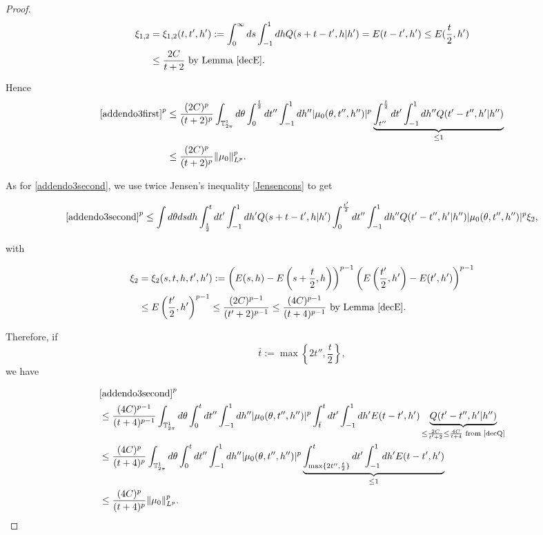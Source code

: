 \documentclass[a4paper,10pt,reqno]{amsart}
\numberwithin{equation}{subsection}
\numberwithin{figure}{subsection}
\begin{document}
\begin{proof}
\begin{align*}
\xi_{1,2}&=\xi_{1,2}(t,t',h'):=\int_0^{\infty}ds\int_{-1}^1dhQ(s+t-t',h|h')=E(t-t',h')\leq E(\frac{t}{2},h')
\\
&\leq\frac{2C}{t+2}\textrm{ by Lemma \ref{decE}}.
\end{align*}

Hence
{\small\begin{align*}
\eqref{addendo3first}^p&\leq\frac{(2C)^p}{(t+2)^p}\int_{\mathbb{T}^1_{2\pi}}d\theta\int_0^{\frac{t}{2}}dt''\int_{-1}^1dh''|\mu_0(\theta,t'',h'')|^p\underbrace{\int_{t''}^{\frac{t}{2}}dt'\int_{-1}^1dh''Q(t'-t'',h'|h'')}_{\leq1}
\\
&\leq\frac{(2C)^p}{(t+2)^p}\|\mu_0\|_{L^p}^p.
\end{align*}}

As for \eqref{addendo3second}, we use twice Jensen's inequality \eqref{Jensencons} to get

{\scriptsize\begin{align*}
\eqref{addendo3second}^p\leq\int d\theta dsdh\int_{\frac{t}{2}}^tdt'\int_{-1}^1dh'Q(s+t-t',h|h')\int_0^{\frac{t'}{2}}dt''\int_{-1}^1dh''Q(t'-t'',h'|h'')|\mu_0(\theta,t'',h'')|^p\xi_2,
\end{align*}}

with

\begin{align*}
\xi_2&=\xi_2(s,t,h,t',h'):=\left(E(s,h)-E\left(s+\frac{t}{2},h\right)\right)^{p-1}\left(E\left(\frac{t'}{2},h'\right)-E(t',h')\right)^{p-1}
\\
&\leq E\left(\frac{t'}{2},h'\right)^{p-1}\leq\frac{(2C)^{p-1}}{(t'+2)^{p-1}}\leq\frac{(4C)^{p-1}}{(t+4)^{p-1}}\textrm{ by Lemma \ref{decE}}.
\end{align*}

Therefore, if
\[
\bar t:=\max\left\{2t'',\frac{t}{2}\right\},
\]
we have

{\tiny\begin{align*}
&\eqref{addendo3second}^p
\\
&\leq\frac{(4C)^{p-1}}{(t+4)^{p-1}}\int_{\mathbb{T}^1_{2\pi}}d\theta\int_0^tdt''\int_{-1}^1dh''|\mu_0(\theta,t'',h'')|^p\int_{\bar t}^tdt'\int_{-1}^1dh'E(t-t',h')\underbrace{Q(t'-t'',h'|h'')}_{\leq\frac{2C}{t'+2}\leq\frac{4C}{t+4}\textrm{ from \eqref{decQ}}}
\\
&\leq\frac{(4C)^p}{(t+4)^p}\int_{\mathbb{T}^1_{2\pi}}d\theta\int_0^tdt''\int_{-1}^1dh''|\mu_0(\theta,t'',h'')|^p\underbrace{\int_{\max\{2t'',\frac{t}{2}\}}^tdt'\int_{-1}^1dh'E(t-t',h')}_{\leq1}
\\
&\leq\frac{(4C)^p}{(t+4)^p}\|\mu_0\|_{L^p}^p.
\end{align*}}


\end{proof}
\end{document}
